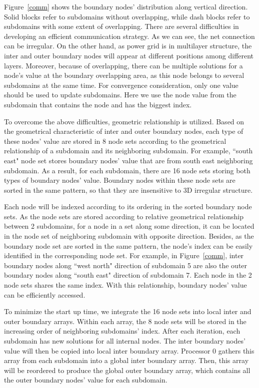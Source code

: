 \documentclass{sig-alternate}
\begin{document}
	Figure~\ref{comm} shows the boundary nodes' distribution along vertical direction. Solid blocks refer to subdomains without 
	overlapping, while dash blocks refer to subdomains with some extent of overlapping. There are several difficulties in developing 
	an efficient communication strategy. As we can see, the net connection can be irregular. On the
	other hand, as power grid is in multilayer structure, the inter and outer boundary nodes will appear at different positions
	among different layers. Moreover, because of overlapping, there can be multiple solutions for a node's value at the boundary 
	overlapping area, as this node belongs to several subdomains at the same time. For convergence consideration, only one value 
	should be used to update subdomains. Here we use the node value from the subdomain that contains the node and has the biggest 
	index.

	To overcome the above difficulties, geometric relationship is utilized. Based on the geometrical characteristic of inter and 
	outer boundary nodes, 
	each type of these nodes' value are stored in 8 node sets according to the geometrical relationship of a subdomain and its 
	neighboring subdomain. For example, ``south east" node set stores boundary nodes' value that are from south east neighboring 
	subdomain.
	As a result, for each subdomain, there are 16 node sets storing both types of boundary nodes' value. Boundary nodes within 
	these node sets are sorted in the same pattern, so that they are insensitive to 3D irregular structure. 

	Each node will be
	indexed according to its ordering in the sorted boundary node sets. As the node sets are stored according to relative geometrical 
	relationship between 2 subdomains, for a node in
	a set along some direction, it can be located in the node set of neighboring subdomain with opposite direction. Besides, as
	the boundary node set are sorted in the same pattern, the node's index can be easily identified in the corresponding node set.
	For example, in Figure~\ref{comm}, inter boundary nodes along ``west north" 
	direction of subdomain 5 are also the outer boundary nodes along ``south east" direction of subdomain 7. Each node in the 
	2 node sets shares the same index. With this relationship, boundary nodes' value can be efficiently accessed.

	To minimize the start up time, we integrate the 16 node sets into local inter and outer boundary arrays. 
	Within each array, the 8 node sets will be stored in the increasing order of neighboring subdomains' index. 
	After each iteration, each subdomain has new solutions for all internal nodes. The inter 
	boundary nodes' value will then be copied into local inter boundary array. Processor 0 gathers this array from each subdomain
	into a global inter boundary array. Then, this array will be reordered to produce the global outer boundary array, which
	contains all the outer boundary nodes' value for each subdomain. 
\end{document}

